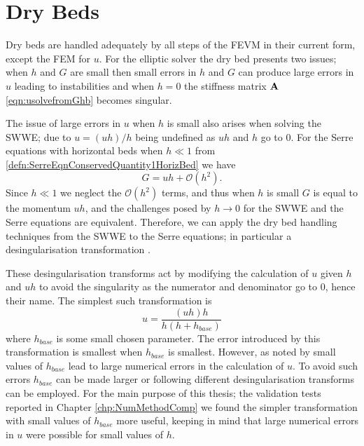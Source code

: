 \section{Dry Beds}
Dry beds are handled adequately by all steps of the FEVM in their current form, except the FEM for $u$. For the elliptic solver the dry bed presents two issues; when $h$ and $G$ are small then small errors in $h$ and $G$ can produce large errors in $u$ leading to instabilities and when $h=0$ the stiffness matrix $\mathbf{A}$ \eqref{eqn:usolvefromGhb} becomes singular.

The issue of large errors in $u$ when $h$ is small also arises when solving the SWWE; due to $u = (uh)/h $ being undefined as $u h $ and $h$ go to $0$. For the Serre equations with horizontal beds when $h \ll 1$ from \eqref{defn:SerreEqnConservedQuantity1HorizBed} we have
\begin{equation}
G = uh + \mathcal{O}\left(h^2\right).
\end{equation}
Since $h \ll 1$ we neglect the $\mathcal{O}\left(h^2\right)$ terms, and thus when $h$ is small $G$ is equal to the momentum $uh$, and the challenges posed by $h \rightarrow 0$ for the SWWE and the Serre equations are equivalent. Therefore, we can apply the dry bed handling techniques from the SWWE to the Serre equations; in particular a desingularisation transformation \cite{Kurganov-Petrova-2007-707}. 

These desingularisation transforms act by modifying the calculation of $u$ given $h$ and $uh$ to avoid the singularity as the numerator and denominator go to $0$, hence their name. The simplest such transformation is
\begin{equation}
u = \frac{(uh) h}{h\left(h + h_{base}\right)}
\label{eqn:calculationofugivenuhandh}
\end{equation}
where $h_{base}$ is some small chosen parameter. The error introduced by this transformation is smallest when $h_{base}$ is smallest. However, as noted by \citet{Kurganov-Petrova-2007-707} small values of $h_{base}$ lead to large numerical errors in the calculation of $u$. To avoid such errors $h_{base}$ can be made larger or following \citet{Kurganov-Petrova-2007-707} different desingularisation transforms can be employed. For the main purpose of this thesis; the validation tests reported in Chapter \ref{chp:NumMethodComp} we found the simpler transformation with small values of $h_{base}$ more useful, keeping in mind that large numerical errors in $u$ were possible for small values of $h$. 

